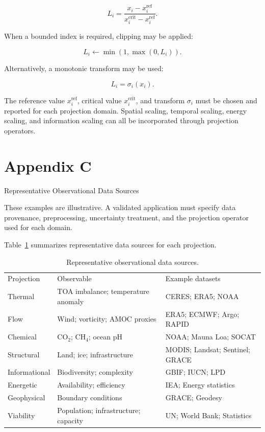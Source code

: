 \[ L_i=\frac{x_i-x_i^{\mathrm{ref}}}{x_i^{\mathrm{crit}}-x_i^{\mathrm{ref}}}. \]

When a bounded index is required, clipping may be applied:

\[ L_i\leftarrow \min(1,\max(0,L_i)). \]

Alternatively, a monotonic transform may be used:

\[ L_i=\sigma_i(x_i). \]

The reference value \(x_i^{\mathrm{ref}}\), critical value \(x_i^{\mathrm{crit}}\), and transform \(\sigma_i\) must be chosen and reported for each projection domain. Spatial scaling, temporal scaling, energy scaling, and information scaling can all be incorporated through projection operators.

\section{Appendix C}

Representative Observational Data Sources

These examples are illustrative. A validated application must specify data provenance, preprocessing, uncertainty treatment, and the projection operator used for each domain.

Table~\ref{tab:data_sources} summarizes representative data sources for each projection.

\begin{table}[tb]
\caption{\label{tab:data_sources}Representative observational data sources.}
\footnotesize
\begin{ruledtabular}
\begin{tabular}{lll}
Projection & Observable & Example datasets \\
Thermal & TOA imbalance; temperature anomaly & CERES; ERA5; NOAA \\
Flow & Wind; vorticity; AMOC proxies & ERA5; ECMWF; Argo; RAPID \\
Chemical & CO$_2$; CH$_4$; ocean pH & NOAA; Mauna Loa; SOCAT \\
Structural & Land; ice; infrastructure & MODIS; Landsat; Sentinel; GRACE \\
Informational & Biodiversity; complexity & GBIF; IUCN; LPD \\
Energetic & Availability; efficiency & IEA; Energy statistics \\
Geophysical & Boundary conditions & GRACE; Geodesy \\
Viability & Population; infrastructure; capacity & UN; World Bank; Statistics \\
\end{tabular}
\end{ruledtabular}
\end{table}
